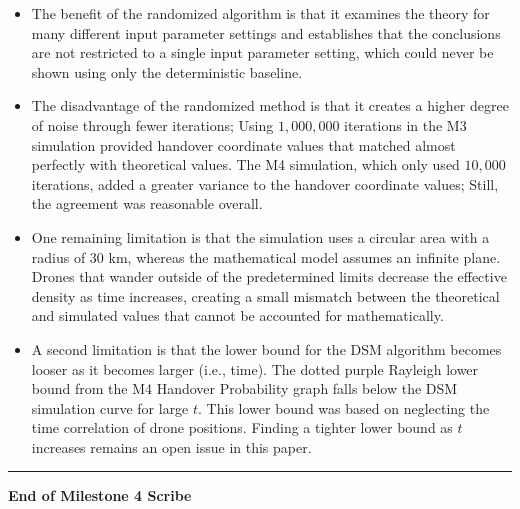 \documentclass[11pt]{article}
\begin{document}
\begin{enumerate}[label=\textbf{Scribe Question \arabic*:}, leftmargin=*, itemsep=1.5em]
\begin{itemize}[leftmargin=*, itemsep=0.4em]
    \item The benefit of the randomized algorithm is that it examines the theory for many different
          input parameter settings and establishes that the conclusions are not restricted to a single
          input parameter setting, which could never be shown using only the deterministic baseline.

    \item The disadvantage of the randomized method is that it creates a higher degree of noise
          through fewer iterations; Using $1{,}000{,}000$ iterations in the M3 simulation provided
          handover coordinate values that matched almost perfectly with theoretical values. The M4
          simulation, which only used $10{,}000$ iterations, added a greater variance to the handover
          coordinate values; Still, the agreement was reasonable overall.

    \item One remaining limitation is that the simulation uses a circular area with a radius of 30 km,
          whereas the mathematical model assumes an infinite plane. Drones that wander outside of
          the predetermined limits decrease the effective density as time increases, creating a small
          mismatch between the theoretical and simulated values that cannot be accounted for
          mathematically.

    \item A second limitation is that the lower bound for the DSM algorithm becomes looser as it
          becomes larger (i.e., time). The dotted purple Rayleigh lower bound from the M4 Handover
          Probability graph falls below the DSM simulation curve for large $t$. This lower bound was
          based on neglecting the time correlation of drone positions. Finding a tighter lower bound
          as $t$ increases remains an open issue in this paper.
\end{itemize}

\end{enumerate}

\bigskip
\hrule
\vspace{0.2cm}
\begin{center}
\textbf{End of Milestone 4 Scribe}
\end{center}
\end{document}
